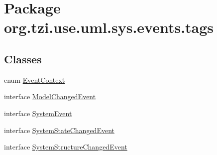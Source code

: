 \hypertarget{namespaceorg_1_1tzi_1_1use_1_1uml_1_1sys_1_1events_1_1tags}{\section{Package org.\-tzi.\-use.\-uml.\-sys.\-events.\-tags}
\label{namespaceorg_1_1tzi_1_1use_1_1uml_1_1sys_1_1events_1_1tags}
}
\subsection*{Classes}
\begin{DoxyCompactItemize}
\item 
enum \hyperlink{enumorg_1_1tzi_1_1use_1_1uml_1_1sys_1_1events_1_1tags_1_1_event_context}{Event\-Context}
\item 
interface \hyperlink{interfaceorg_1_1tzi_1_1use_1_1uml_1_1sys_1_1events_1_1tags_1_1_model_changed_event}{Model\-Changed\-Event}
\item 
interface \hyperlink{interfaceorg_1_1tzi_1_1use_1_1uml_1_1sys_1_1events_1_1tags_1_1_system_event}{System\-Event}
\item 
interface \hyperlink{interfaceorg_1_1tzi_1_1use_1_1uml_1_1sys_1_1events_1_1tags_1_1_system_state_changed_event}{System\-State\-Changed\-Event}
\item 
interface \hyperlink{interfaceorg_1_1tzi_1_1use_1_1uml_1_1sys_1_1events_1_1tags_1_1_system_structure_changed_event}{System\-Structure\-Changed\-Event}
\end{DoxyCompactItemize}

